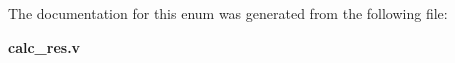 \subsubsection[{res\-Y\-\_\-q}]{ {\bfseries \textcolor{vhdlchar}{ }} \hspace{0.3cm}}\label{enum1calc__res_a0f6b4cc97de341feb2975fb6f3c9b8b2}


The documentation for this enum was generated from the following file\-:\begin{DoxyCompactItemize}
\item 
{\bf calc\-\_\-res.\-v}\end{DoxyCompactItemize}
